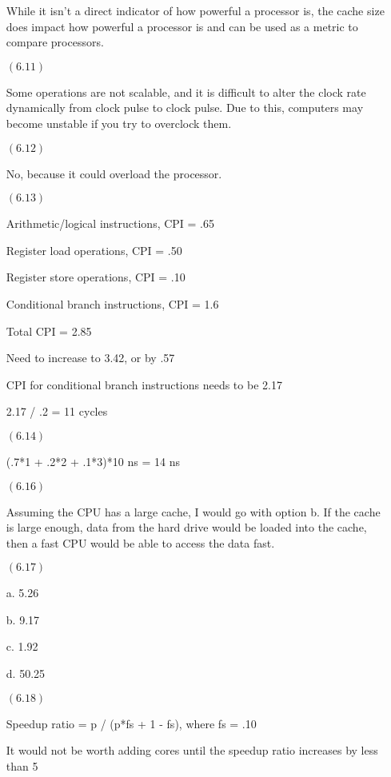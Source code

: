 \documentclass[letterpaper,10pt,titlepage]{article}
\begin{document}
\begin{enumerate}
  While it isn't a direct indicator of how powerful a processor is, the cache size does impact how powerful a processor is and can 
  be used as a metric to compare processors.

\item[$(6.11)$]

  Some operations are not scalable, and it is difficult to alter the clock rate dynamically from clock pulse to clock pulse.
  Due to this, computers may become unstable if you try to overclock them.
  
\item[$(6.12)$]

  No, because it could overload the processor.

\item[$(6.13)$]

  Arithmetic/logical instructions, CPI = .65
  
  Register load operations, CPI = .50
  
  Register store operations, CPI = .10
  
  Conditional branch instructions, CPI = 1.6
  
  Total CPI = 2.85
  
  Need to increase to 3.42, or by .57
  
  CPI for conditional branch instructions needs to be 2.17
  
  2.17 / .2 = 11 cycles
  
\item[$(6.14)$]

  (.7*1 + .2*2 + .1*3)*10 ns = 14 ns

\item[$(6.16)$]
  
  Assuming the CPU has a large cache, I would go with option b.
  If the cache is large enough, data from the hard drive would be loaded into the cache, then a fast CPU would be able to access the data fast.

\item[$(6.17)$]

  a. 5.26

  b. 9.17

  c. 1.92

  d. 50.25

\item[$(6.18)$]

  Speedup ratio = p / (p*fs + 1 - fs), where fs = .10
  
  It would not be worth adding cores until the speedup ratio increases by less than 5%
  

\end{enumerate}
\end{document}
